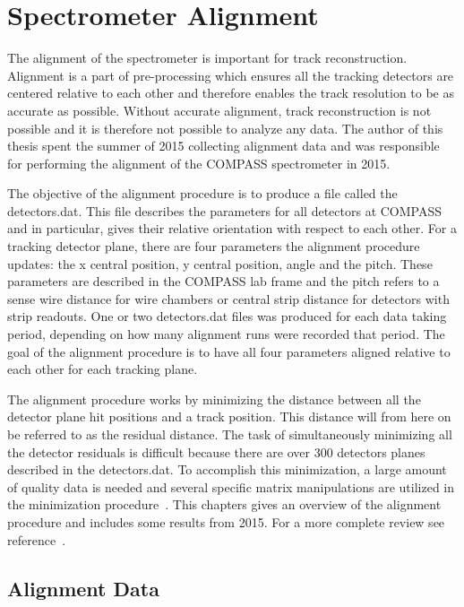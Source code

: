 \chapter{Spectrometer Alignment} \label{ch::alignment}

The alignment of the spectrometer is important for track reconstruction.
Alignment is a part of pre-processing which ensures all the tracking detectors
are centered relative to each other and therefore enables the track resolution
to be as accurate as possible.  Without accurate alignment, track reconstruction
is not possible and it is therefore not possible to analyze any data.  The
author of this thesis spent the summer of 2015 collecting alignment data and was
responsible for performing the alignment of the COMPASS spectrometer in 2015.

The objective of the alignment procedure is to produce a file called the
detectors.dat.  This file describes the parameters for all detectors at COMPASS
and in particular, gives their relative orientation with respect to each other.
For a tracking detector plane, there are four parameters the alignment procedure
updates: the x central position, y central position, angle and the pitch.  These
parameters are described in the COMPASS lab frame and the pitch refers to a
sense wire distance for wire chambers or central strip distance for detectors
with strip readouts.  One or two detectors.dat files was produced for each data
taking period, depending on how many alignment runs were recorded that period.
The goal of the alignment procedure is to have all four parameters aligned
relative to each other for each tracking plane.

The alignment procedure works by minimizing the distance between all the
detector plane hit positions and a track position.  This distance will from here
on be referred to as the residual distance.  The task of simultaneously
minimizing all the detector residuals is difficult because there are over 300
detectors planes described in the detectors.dat.  To accomplish this
minimization, a large amount of quality data is needed and several specific
matrix manipulations are utilized in the minimization
procedure~\cite{matrix_inv}.  This chapters gives an overview of the alignment
procedure and includes some results from 2015.  For a more complete review see
reference~\cite{compassAlignmentNote}.


\section{Alignment Data}

